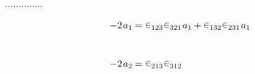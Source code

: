 ..............

\vspace{1em}
\begin{alignat*}{2}
-2 \hspace{.2ex} a_{1} \hspace{-0.1ex}
& = \hspace{.4ex} \tikzmark{permutationsparity123for1FROM} \hspace{-0.4ex} \permutationsparitysymbols{123} \hspace{-0.3ex} \tikzmark{permutationsparity123for1TO} \hspace{.3ex}
\hspace{.4ex} \tikzmark{permutationsparity321for1FROM} \hspace{-0.4ex} \permutationsparitysymbols{321} \hspace{-0.3ex} \tikzmark{permutationsparity321for1TO} \hspace{.4ex}
a_{1} \hspace{-0.1ex} \tikzmark{permutationsparity321with1ENDS}
+ \hspace{.4ex} \tikzmark{permutationsparity132for1FROM} \hspace{-0.4ex} \permutationsparitysymbols{132} \hspace{-0.3ex} \tikzmark{permutationsparity132for1TO} \hspace{.3ex}
\hspace{.4ex} \tikzmark{permutationsparity231for1FROM} \hspace{-0.4ex} \permutationsparitysymbols{231} \hspace{-0.3ex} \tikzmark{permutationsparity231for1TO} \hspace{.4ex}
a_{1} \hspace{-0.1ex} \tikzmark{permutationsparity231with1ENDS}
\\[2.5em]
-2 \hspace{.2ex} a_{2} \hspace{-0.1ex}
& = \hspace{.4ex} \tikzmark{permutationsparity213for2FROM} \hspace{-0.4ex} \permutationsparitysymbols{213} \hspace{-0.3ex} \tikzmark{permutationsparity213for2TO} \hspace{.3ex}
\hspace{.4ex} \tikzmark{permutationsparity312for2FROM} \hspace{-0.4ex} \permutationsparitysymbols{312} \hspace{-0.3ex} \tikzmark{permutationsparity312for2TO} \hspace{.5ex}

\end{alignat*}
